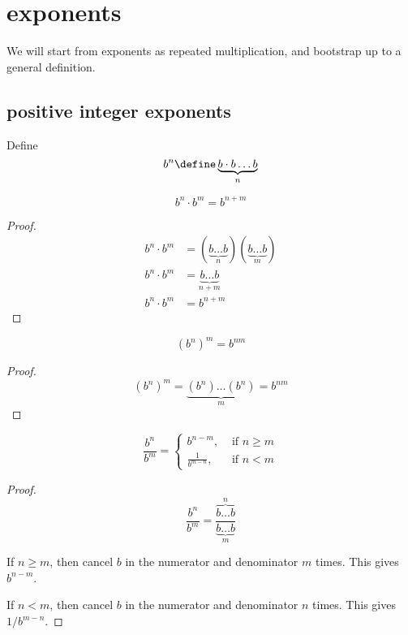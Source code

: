 \documentclass[10pt]{scrartcl}
\begin{document}
\section{exponents}
We will start from exponents as repeated multiplication, and bootstrap up to a general definition. 
\subsection{positive integer exponents}
\begin{defn}
  Define 
  \[
  b^n\define \underbrace{b\cdot b \dots b}_n
  \]
\end{defn}

\begin{theorem} \label{th:exp-mult}
  \begin{equation}
    \label{eq:exp-mult}
    b^n \cdot b^m = b^{n+m}
  \end{equation}
\end{theorem}
\begin{proof}
  \begin{align*}
    b^n\cdot b^m &= (\underbrace{b\dots b}_n) (\underbrace{b\dots b}_m) \\
    b^n\cdot b^m &= \underbrace{b\dots b}_{n+m} \\
    b^n\cdot b^m &= b^{n+m}
  \end{align*}
\end{proof}
\begin{cor}
  \label{th:exp-exp}
  \begin{equation}
    \label{eq:exp-exp}
    \left(b^n\right)^m = b^{nm}
  \end{equation}
\end{cor}
\begin{proof}
  \[
  (b^n)^m = \underbrace{(b^n)\dots (b^n)}_m = b^{nm}
  \]
\end{proof}

\begin{cor}
  \label{th:exp-div0}
  \begin{equation}
    \label{eq:exp-div0}
    \frac{b^n}{b^m}=
    \begin{cases}
      b^{n-m},&\textrm{ if } n\geq m \\
      \frac{1}{b^{m-n}},&\textrm{ if } n < m
    \end{cases}
  \end{equation}
\end{cor}
\begin{proof}
  \[
  \frac{b^n}{b^m}=\frac{\overbrace{b\dots b}^n}{\underbrace{b\dots b}_m}
  \]

  If $n\geq m$, then cancel $b$ in the numerator and denominator $m$ times. This gives $b^{n-m}$. 
  
If $n<m$, then cancel $b$ in the numerator and denominator $n$ times. This gives $1/b^{m-n}$. 
\end{proof}
\end{document}
